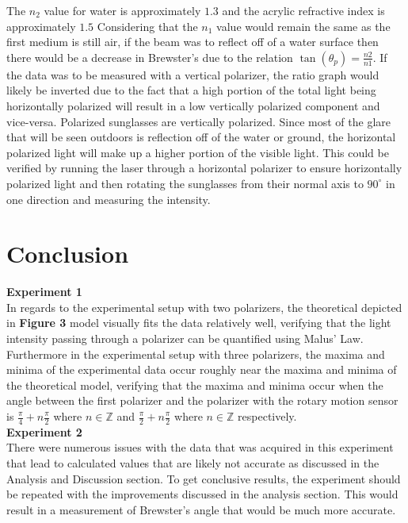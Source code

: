\documentclass[
	letterpaper, %
	10pt, %
]{CSUniSchoolLabReport}
\begin{document}
The $n_2$ value for water is approximately $1.3$ and the acrylic refractive index is approximately $1.5$ Considering that the
$n_1$ value would remain the same as the first medium is still air, if the beam was to reflect off of a
water surface then there would be a decrease in Brewster's due to the relation $\tan(\theta_p) = \frac{n2}{n1}$. If the
data was to be measured with a vertical polarizer, the ratio graph would likely be inverted due to the fact that a high portion
of the total light being horizontally polarized will result in a low vertically polarized component and vice-versa. Polarized sunglasses
are vertically polarized. Since most of the glare that will be seen outdoors is reflection off of the water or ground, the
horizontal polarized light will make up a higher portion of the visible light. This could be verified by running the laser through
a horizontal polarizer to ensure horizontally polarized light and then rotating the sunglasses from their normal axis to $90^\circ$
in one direction and measuring the intensity.

\section{Conclusion}
\textbf{Experiment 1}\\
In regards to the experimental setup with two polarizers, the theoretical depicted in \textbf{Figure 3} model visually fits the data relatively well,
verifying that the light intensity passing through a polarizer can be quantified using Malus' Law. Furthermore in the
experimental setup with three polarizers, the maxima and minima of the experimental data occur roughly near the maxima
and minima of the theoretical model, verifying that the maxima and minima occur when the angle between the first polarizer
and the polarizer with the rotary motion sensor is $\frac{\pi}{4} + n\frac{\pi}{2}$ where $n \in \mathbb{Z}$ and
$\frac{\pi}{2}+n\frac{\pi}{2}$ where $n\in \mathbb{Z}$ respectively.\\

\textbf{Experiment 2}\\
There were numerous issues with the data that was acquired in this experiment that lead to calculated values that are
likely not accurate as discussed in the Analysis and Discussion section. To get conclusive results, the experiment should be
repeated with the improvements discussed in the analysis section. This would result in a measurement
of Brewster's angle that would be much more accurate.
\newpage
\end{document}
